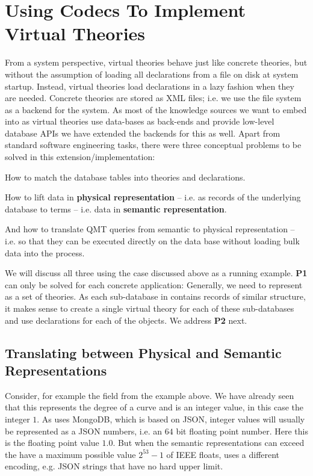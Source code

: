 \section{Using Codecs To Implement \lmfdb Virtual Theories}\label{sec:vt}

From a system perspective, virtual theories behave just like concrete theories, but
without the assumption of loading all declarations from a file on disk at system startup.
Instead, virtual theories load declarations in a lazy fashion when they are
needed. Concrete theories are stored as XML files; i.e. we use the file system as a
backend for the \mmt system. As most of the knowledge sources we want to embed into \ommt
as virtual theories use data-bases as back-ends and provide low-level database APIs we
have extended the \mmt backends for this as well. Apart from standard software engineering
tasks, there were three conceptual problems to be solved in this extension/implementation:
\begin{compactenum}[\bf P1]
\item How to match the database tables into \ommt theories and declarations. 
\item How to lift data in \textbf{physical representation} -- i.e. as records of the
  underlying database to \ommt terms -- i.e. data in \textbf{semantic representation}.
\item And how to translate QMT queries from semantic to physical representation -- i.e. so
  that they can be executed directly on the data base without loading bulk data into the
  \mmt process.
\end{compactenum}
We will discuss all three using the \lmfdb case discussed above as a running
example. \textbf{P1} can only be solved for each concrete application: Generally, we need
to represent \lmfdb as a set of \ommt theories.  As each sub-database in \lmfdb contains
records of similar structure, it makes sense to create a single virtual theory for each of
these sub-databases and use \ommt declarations for each of the objects. We address
\textbf{P2} next.

\subsection{Translating between Physical and Semantic Representations}\label{sec:vt:translation}

Consider, for example the  field from the example above.  We have
already seen that this represents the degree of a curve and is an integer value, in this
case the integer $1$.  As \lmfdb uses MongoDB, which is based on JSON, integer values will
usually be represented as a JSON numbers, i.e. an  $64$ bit floating
point number.  Here this is the floating point value $1.0$. But when the semantic
representations can exceed the have a maximum possible value $2^{53}-1$ of IEEE floats,
\lmfdb uses a different encoding, e.g. JSON strings that have no hard upper limit.

